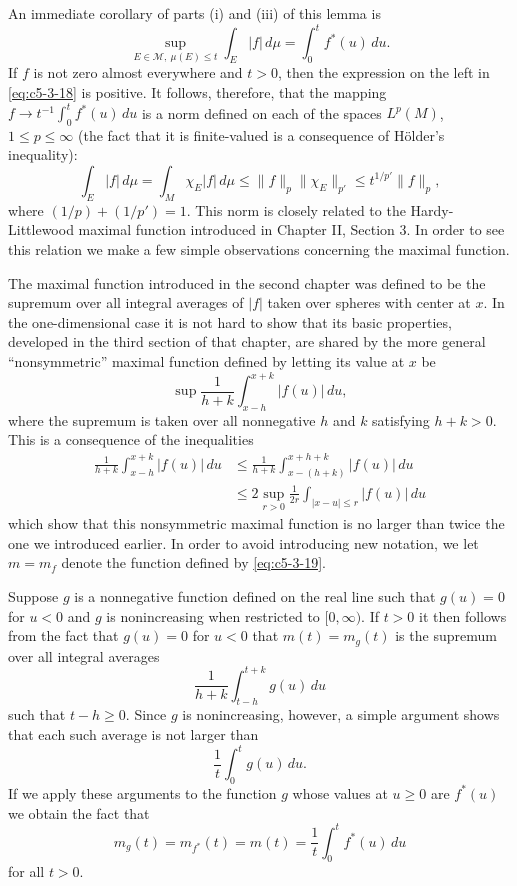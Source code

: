 An immediate corollary of parts (i) and (iii) of this lemma is
\begin{equation}\label{eq:c5-3-18}
\sup_{E \in \mathcal{M},\ \mu(E) \leq t}\int_{E}|f|\,d\mu=\int_{0}^{t}f^{*}(u)\,du.
\end{equation}
If $f$ is not zero almost everywhere and $t > 0$, then the expression on the
left in \eqref{eq:c5-3-18} is positive. It follows, therefore, that the mapping
$f \to t^{-1}\int_{0}^{t}f^{*}(u)\,du$ is a norm defined on each of the spaces
$L^{p}(M)$, $1 \leq p \leq \infty$ (the fact that it is finite-valued is a
consequence of H\"older's inequality):
\[
\int_{E}|f|\,d\mu=\int_{M}\chi_{E}|f|\,d\mu\leq\|f\|_{p}\|\chi_{E}\|_{p'}
\leq t^{1/p'}\|f\|_{p},
\]
where $(1/p) + (1/p') = 1$. This norm is closely related to the
Hardy-Littlewood maximal function introduced in Chapter II, Section 3. In
order to see this relation we make a few simple observations concerning the
maximal function.

The maximal function introduced in the second chapter was defined to be the
supremum over all integral averages of $|f|$ taken over spheres with center at
$x$. In the one-dimensional case it is not hard to show that its basic
properties, developed in the third section of that chapter, are shared by the
more general ``nonsymmetric'' maximal function defined by letting its value at
$x$ be
\begin{equation}\label{eq:c5-3-19}
\sup\frac{1}{h+k}\int_{x-h}^{x+k}|f(u)|\,du,
\end{equation}
where the supremum is taken over all nonnegative $h$ and $k$ satisfying
$h + k > 0$. This is a consequence of the inequalities
\begin{align*}
\frac{1}{h+k}\int_{x-h}^{x+k}|f(u)|\,du
&\leq\frac{1}{h+k}\int_{x-(h+k)}^{x+h+k}|f(u)|\,du\\
&\leq 2\sup_{r>0}\frac{1}{2r}\int_{|x-u| \leq r}|f(u)|\,du
\end{align*}
which show that this nonsymmetric maximal function is no larger than twice the
one we introduced earlier. In order to avoid introducing new notation, we let
$m = m_{f}$ denote the function defined by \eqref{eq:c5-3-19}.

Suppose $g$ is a nonnegative function defined on the real line such that
$g(u) = 0$ for $u < 0$ and $g$ is nonincreasing when restricted to
$[0, \infty)$. If $t > 0$ it then follows from the fact that $g(u) = 0$ for
$u < 0$ that $m(t) = m_{g}(t)$ is the supremum over all integral averages
\[
\frac{1}{h+k}\int_{t-h}^{t+k}g(u)\,du
\]
such that $t - h \geq 0$. Since $g$ is nonincreasing, however, a simple
argument shows that each such average is not larger than
\[
\frac{1}{t}\int_{0}^{t}g(u)\,du.
\]
If we apply these arguments to the function $g$ whose values at $u \geq 0$ are
$f^{*}(u)$ we obtain the fact that
\[
m_{g}(t)=m_{f^{*}}(t)=m(t)=\frac{1}{t}\int_{0}^{t}f^{*}(u)\,du
\]
for all $t > 0$.


